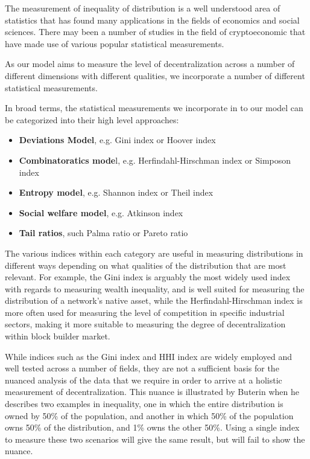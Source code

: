 \documentclass[conference]{IEEEtran}
\begin{document}
The measurement of inequality of distribution is a well understood area of statistics that has found many applications in the fields of economics and social sciences. There may been a number of studies in the field of cryptoeconomic that have made use of various popular statistical measurements.

As our model aims to measure the level of decentralization across a number of different dimensions with different qualities, we incorporate a number of different statistical measurements.

In broad terms, the statistical measurements we incorporate in to our model can be categorized into their high level approaches:

\begin{itemize}
    \item \textbf{Deviations Model}, e.g. Gini index or Hoover index
    \item \textbf{Combinatoratics mode}l, e.g. Herfindahl-Hirschman index or Simposon index
    \item \textbf{Entropy model}, e.g. Shannon index or Theil index
    \item \textbf{Social welfare model}, e.g. Atkinson index
    \item \textbf{Tail ratios}, such Palma ratio or Pareto ratio
\end{itemize}

The various indices within each category are useful in measuring distributions in different ways depending on what qualities of the distribution that are most relevant.  For example, the Gini index is arguably the most widely used index with regards to measuring wealth inequality, and is well suited for measuring the distribution of a network's native asset, while the Herfindahl-Hirschman index is more often used for measuring the level of competition in specific industrial sectors, making it more suitable to measuring the degree of decentralization within block builder market.

While indices such as the Gini index and HHI index are widely employed and well tested across a number of fields, they are not a sufficient basis for the nuanced analysis of the data that we require in order to arrive at a holistic measurement of decentralization.  This nuance is illustrated by Buterin \cite{buterin2022b} when he describes two examples in inequality, one in which the entire distribution is owned by 50\% of the population, and another in which 50\% of the population owns 50\% of the distribution, and 1\% owns the other 50\%.  Using a single index to measure these two scenarios will give the same result, but will fail to show the nuance.
\end{document}
